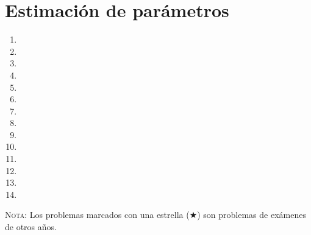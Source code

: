 \documentclass[a4paper,dvips,titlepage]{article}
\begin{document}
\section{Estimación de parámetros}
\begin{enumerate}[leftmargin=*,resume]
\item {}
\item {}
\item {}
\item {}
\item {}
\item {}
\item {}
\item {}
\item {}
\item {}
\item {}
\item {}
\item {}
\item {}
\end{enumerate}

\vspace{2cm}

\textsc{Nota}: Los problemas marcados con una estrella ($\bigstar$) son problemas de
exámenes de otros años.
\end{document}

